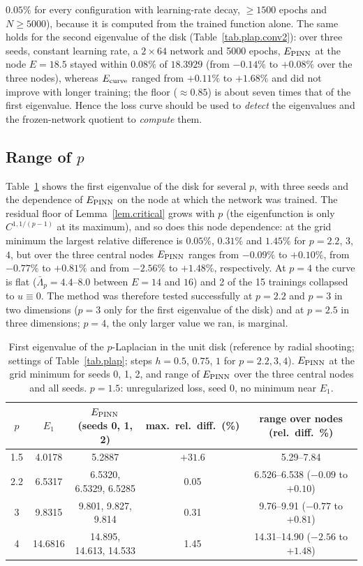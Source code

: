 \documentclass[10pt]{amsart}
\newenvironment{revblock}{\color{blue}}{}
\theoremstyle{definition}
\theoremstyle{remark}
\theoremstyle{plain}
\begin{document}
\begin{revblock}
$0.05\%$ for every configuration with learning-rate decay, $\ge1500$ epochs and $N\ge5000$), because it
is computed from the trained function alone. The same holds for the second eigenvalue of the disk
(Table~\ref{tab.plap.conv2}): over three seeds, constant learning rate, a $2\times64$ network and 5000
epochs, $E_{\rm PINN}$ at the node $E=18.5$ stayed within $0.08\%$ of $18.3929$ (from $-0.14\%$ to
$+0.08\%$ over the three nodes), whereas $E_{\rm curve}$ ranged from $+0.11\%$ to $+1.68\%$ and did not
improve with longer training; the floor ($\approx0.85$) is about seven times that of the first
eigenvalue.
Hence the loss curve should be used to \emph{detect} the eigenvalues and the frozen-network quotient
to \emph{compute} them.

\subsection{Range of \texorpdfstring{$p$}{p}}
Table~\ref{tab.plap.p} shows the first eigenvalue of the disk for several $p$, with three seeds and
the dependence of $E_{\rm PINN}$ on the node at which the network was trained. The residual floor of
Lemma~\ref{lem.critical} grows with $p$ (the eigenfunction is only $C^{1,1/(p-1)}$ at its maximum),
and so does this node dependence: at the grid minimum the largest relative difference is $0.05\%$,
$0.31\%$ and $1.45\%$ for $p=2.2$, $3$, $4$, but over the three central nodes $E_{\rm PINN}$ ranges from
$-0.09\%$ to $+0.10\%$, from $-0.77\%$ to $+0.81\%$ and from $-2.56\%$ to $+1.48\%$, respectively. At
$p=4$ the curve is flat ($\bar\Lambda_p=4.4$--$8.0$ between $E=14$ and $16$) and 2 of the 15 trainings
collapsed to $u\equiv0$. The method was therefore tested successfully at $p=2.2$ and $p=3$ in two
dimensions ($p=3$ only for the first eigenvalue of the disk) and at $p=2.5$ in three dimensions;
$p=4$, the only larger value we ran, is marginal.

\begin{table}[tbp]
\centering\small
\color{blue}
\caption{First eigenvalue of the $p$-Laplacian in the unit disk (reference by radial shooting; settings of Table~\ref{tab.plap}; steps $h=0.5$, $0.75$, $1$ for $p=2.2,3,4$). $E_{\rm PINN}$ at the grid minimum for seeds 0, 1, 2, and range of $E_{\rm PINN}$ over the three central nodes and all seeds. $p=1.5$: unregularized loss, seed 0, no minimum near $E_1$.}
\label{tab.plap.p}
\begin{tabular}{ccccc}
\toprule
$p$ & $E_1$ & $E_{\rm PINN}$ (seeds 0, 1, 2) & max.\ rel.\ diff.\ (\%) & range over nodes (rel.\ diff.\ \%)\\
\midrule
1.5 & 4.0178 & 5.2887 & $+31.6$ & 5.29--7.84\\
2.2 & 6.5317 & 6.5320, 6.5329, 6.5285 & 0.05 & 6.526--6.538 ($-0.09$ to $+0.10$)\\
3 & 9.8315 & 9.801, 9.827, 9.814 & 0.31 & 9.76--9.91 ($-0.77$ to $+0.81$)\\
4 & 14.6816 & 14.895, 14.613, 14.533 & 1.45 & 14.31--14.90 ($-2.56$ to $+1.48$)\\
\bottomrule
\end{tabular}
\end{table}


\end{revblock}
\end{document}

